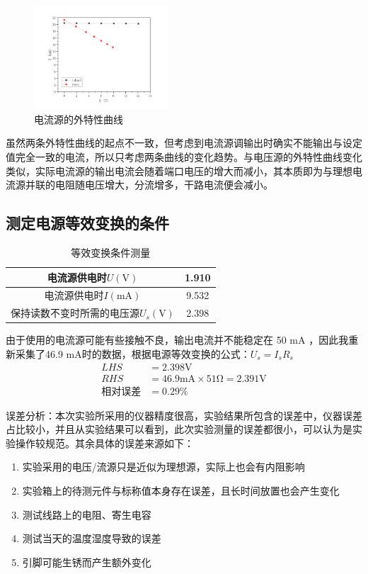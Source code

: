 \documentclass[a4paper,utf8]{article}
\begin{document}
        \begin{figure}[!ht]
            \caption{电流源的外特性曲线}
            \includegraphics[width=0.45\textwidth]{fig4.pdf}
        \end{figure}\par
        虽然两条外特性曲线的起点不一致，但考虑到电流源调输出时确实不能输出与设定值完全一致的电流，所以只考虑两条曲线的变化趋势。与电压源的外特性曲线变化类似，实际电流源的输出电流会随着端口电压的增大而减小，其本质即为与理想电流源并联的电阻随电压增大，分流增多，干路电流便会减小。\newpage
    \subsection{测定电源等效变换的条件} 
        \begin{table}[!ht]
            \centering\begin{tabular}{|c | c|}\hline
                电流源供电时$U (\unit{\V})$ & 1.910  \\\hline
                电流源供电时$I (\unit{\mA})$ & 9.532 \\\hline
                保持读数不变时所需的电压源$U_s (\unit{\V})$ & 2.398 \\ \hline
            \end{tabular}\caption{等效变换条件测量}
        \end{table}\par
        由于使用的电流源可能有些接触不良，输出电流并不能稳定在 50 mA ，因此我重新采集了46.9 mA时的数据，根据电源等效变换的公式：$U_s=I_s R_s$
        \begin{align*}
            LHS&=2.398 \unit{\V} \\
            RHS&=46.9\unit{\mA} \times 51\unit{\ohm}=2.391 \unit{\V}\\
            \text{相对误差}&=0.29 \%
        \end{align*}

        误差分析：本次实验所采用的仪器精度很高，实验结果所包含的误差中，仪器误差占比较小，并且从实验结果可以看到，此次实验测量的误差都很小，可以认为是实验操作较规范。其余具体的误差来源如下：
        \begin{enumerate}
            \item 实验采用的电压/流源只是近似为理想源，实际上也会有内阻影响
            \item 实验箱上的待测元件与标称值本身存在误差，且长时间放置也会产生变化
            \item 测试线路上的电阻、寄生电容
            \item 测试当天的温度湿度导致的误差
            \item 引脚可能生锈而产生额外变化
        \end{enumerate}
   
\end{document}
